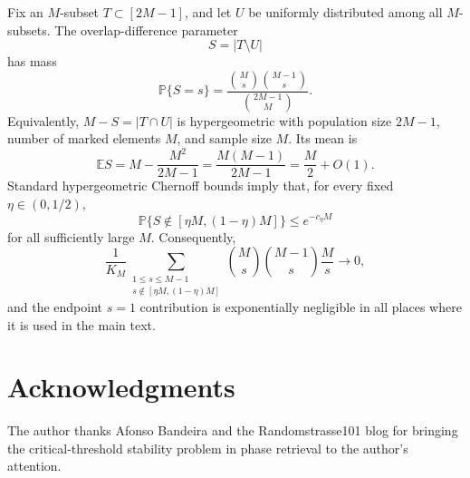 \documentclass[11pt]{article}
\newcommand{\Pbb}{\mathbb P}
\newcommand{\Ebb}{\mathbb E}
\newcommand{\1}{\mathbf 1}
\begin{document}
Fix an \(M\)-subset \(T\subset[2M-1]\), and let \(U\) be uniformly distributed among all
\(M\)-subsets.  The overlap-difference parameter
\[
        S=|T\setminus U|
\]
has mass
\[
        \Pbb\{S=s\}=\frac{\binom Ms\binom{M-1}s}{\binom{2M-1}{M}}.
\]
Equivalently, \(M-S=|T\cap U|\) is hypergeometric with population size \(2M-1\),
number of marked elements \(M\), and sample size \(M\).  Its mean is
\[
        \Ebb S=M-\frac{M^2}{2M-1}=\frac{M(M-1)}{2M-1}=\frac M2+O(1).
\]
Standard hypergeometric Chernoff bounds imply that, for every fixed \(\eta\in(0,1/2)\),
\[
        \Pbb\{S\notin[\eta M,(1-\eta)M]\}\le e^{-c_\eta M}
\]
for all sufficiently large \(M\).  Consequently,
\[
        \frac1{K_M}\sum_{\substack{1\le s\le M-1\\s\notin[\eta M,(1-\eta)M]}}
        \binom Ms\binom{M-1}s\frac Ms
        \longrightarrow0,
\]
and the endpoint \(s=1\) contribution is exponentially negligible in all places where it
is used in the main text.

\section*{Acknowledgments}
The author thanks Afonso Bandeira and the Randomstrasse101 blog for bringing
the critical-threshold stability problem in phase retrieval to the author's
attention.
\end{document}
